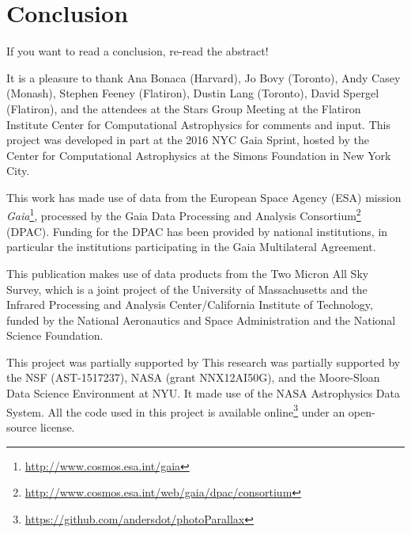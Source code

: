 \documentclass[modern]{aastex61}
\newcommand{\acronym}[1]{{\small{#1}}}
\newcommand{\project}[1]{\textsl{#1}}
\newcommand{\gaia}{\project{Gaia}}
\begin{document}
\section{Conclusion}
If you want to read a conclusion, re-read the abstract!

\acknowledgments It is a pleasure to thank
  Ana Bonaca (Harvard),
  Jo Bovy (Toronto),
  Andy Casey (Monash),
  Stephen Feeney (Flatiron),
  Dustin Lang (Toronto),
  David Spergel (Flatiron),
and the attendees at the Stars Group Meeting at the Flatiron Institute
Center for Computational Astrophysics for comments and input.
This project was developed in part at the 2016 \acronym{NYC} Gaia Sprint, hosted
by the Center for Computational Astrophysics at the Simons Foundation
in New York City.

This work has made use of data from the European Space Agency (\acronym{ESA})
mission \gaia\footnote{\url{http://www.cosmos.esa.int/gaia}}, processed by the Gaia
Data Processing and Analysis Consortium\footnote{\url{http://www.cosmos.esa.int/web/gaia/dpac/consortium}} (\acronym{DPAC}). Funding for the
\acronym{DPAC} has been provided by national institutions, in particular the
institutions participating in the Gaia Multilateral Agreement.

This publication makes use of data products from the Two Micron All
Sky Survey, which is a joint project of the
University of Massachusetts and the Infrared Processing and Analysis
Center/California Institute of Technology, funded by the National
Aeronautics and Space Administration and the National Science
Foundation.

This project was partially supported by This research was partially supported by
  the \acronym{NSF} (\acronym{AST-1517237}),
  \acronym{NASA} (grant \acronym{NNX12AI50G}),
  and the Moore-Sloan Data Science Environment at \acronym{NYU}.
It made use of the \acronym{NASA} Astrophysics Data System.
All the code used in this project is available online\footnote{\url{https://github.com/andersdot/photoParallax}} under an open-source license.




\clearpage
\end{document}
